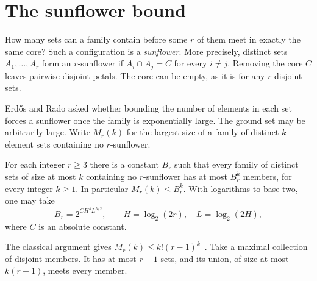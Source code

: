 \section{The sunflower bound}\label{sec:intro}

How many sets can a family contain before some \(r\) of them meet in
exactly the same core? Such a configuration is a \emph{sunflower}.
More precisely, distinct sets \(A_1,\ldots,A_r\) form an \(r\)-sunflower
if \(A_i\cap A_j=C\) for every \(i\ne j\). Removing the core \(C\)
leaves pairwise disjoint petals. The core can be empty, as it is
for any \(r\) disjoint sets.

Erd\H{o}s and Rado asked whether bounding the number of elements in
each set forces a sunflower once the family is exponentially large.
The ground set may be arbitrarily large. Write \(M_r(k)\) for the
largest size of a family of distinct \(k\)-element sets containing
no \(r\)-sunflower.

\begin{theorem}\label{thm:main}
For each integer \(r\ge3\) there is a constant \(B_r\) such that every
family of distinct sets of size at most \(k\) containing no
\(r\)-sunflower has at most \(B_r^k\) members, for every integer
\(k\ge1\). In particular \(M_r(k)\le B_r^k\). With logarithms to
base two, one may take
\[
 B_r=2^{C H^4 L^{5/2}},\qquad H=\log_2(2r),\quad L=\log_2(2H),
\]
where \(C\) is an absolute constant.
\end{theorem}

The classical argument gives \(M_r(k)\le k!(r-1)^k\)~\cite{ER}.
Take a maximal collection of disjoint members. It has at most \(r-1\)
sets, and its union, of size at most \(k(r-1)\), meets every member.
